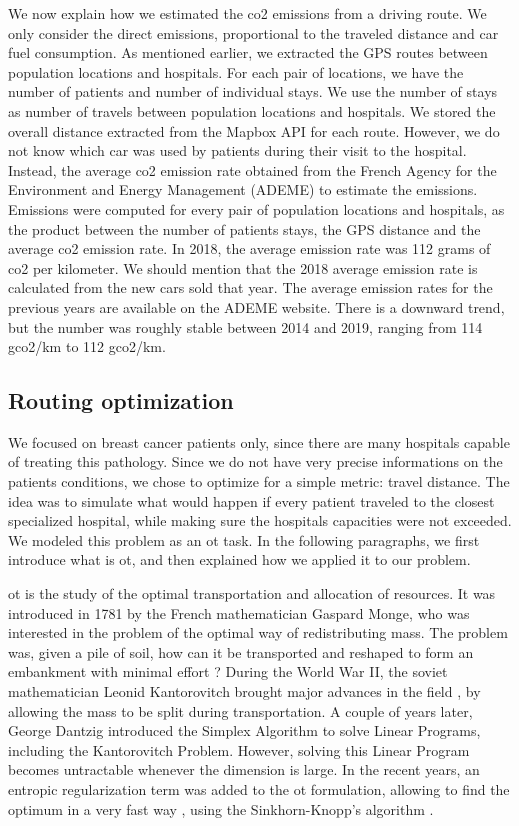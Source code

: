 We now explain how we estimated the \ac{co2} emissions from a driving route. We
only consider the direct emissions, proportional to the traveled distance and
car fuel consumption. As mentioned earlier, we extracted the GPS routes between
population locations and hospitals. For each pair of locations, we have the
number of patients and number of individual stays. We use the number of stays as
number of travels between population locations and hospitals. We stored the
overall distance extracted from the Mapbox API for each route. However, we do
not know which car was used by patients during their visit to the hospital.
Instead, the average \ac{co2} emission rate obtained from the French Agency for
the Environment and Energy Management (ADEME) to estimate the emissions.
Emissions were computed for every pair of population locations and hospitals, as
the product between the number of patients stays, the GPS distance and the
average \ac{co2} emission rate. In 2018, the average emission rate was 112 grams
of \ac{co2} per kilometer. We should mention that the 2018 average emission rate
is calculated from the new cars sold that year. The average emission rates for
the previous years are available on the ADEME website. There is a downward
trend, but the number was roughly stable between 2014 and 2019, ranging from 114
g\ac{co2}/km to 112 g\ac{co2}/km.

\subsection{Routing optimization}

We focused on breast cancer patients only, since there are many hospitals
capable of treating this pathology. Since we do not have very precise
informations on the patients conditions, we chose to optimize for a simple
metric: travel distance. The idea was to simulate what would happen if every
patient traveled to the closest specialized hospital, while making sure the
hospitals capacities were not exceeded. We modeled this problem as an \acf{ot}
task. In the following paragraphs, we first introduce what is \ac{ot}, and then
explained how we applied it to our problem.

\acf{ot} is the study of the optimal transportation and allocation of resources.
It was introduced in 1781 by the French mathematician Gaspard Monge,
\cite{monge_memoire_1781} who was interested in the problem of the optimal way
of redistributing mass. The problem was, given a pile of soil, how can it be
transported and reshaped to form an embankment with minimal effort ? During
the World War II, the soviet mathematician Leonid Kantorovitch brought major
advances in the field \cite{kantorovitch_translocation_1958}, by allowing the
mass to be split during transportation. A couple of years later, George
Dantzig introduced the Simplex Algorithm to solve Linear Programs, including
the Kantorovitch Problem. However, solving this Linear Program becomes
untractable whenever the dimension is large. In the recent years, an
entropic regularization term was added to the \ac{ot} formulation, allowing to
find the optimum in a very fast way \cite{cuturi_sinkhorn_2013}, using the
Sinkhorn-Knopp's algorithm \cite{knopp_concerning_1967}.


